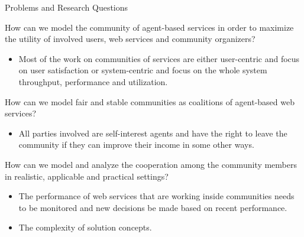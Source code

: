\documentclass{beamer}
\begin{document}
\begin{frame}{Problems and Research Questions}


    \footnotesize{\colorbox{blue}{\color{white}{R1}} How can we model the community of agent-based services in order to maximize the utility
        of involved users, web services and community organizers?}\\
        \begin{itemize}
            \item Most of the work on communities of
            services are either user-centric and focus on user satisfaction
            or system-centric and focus on the whole system throughput, performance and utilization.
        \end{itemize}
    \vspace{0.3cm} \colorbox{blue}{\color{white}{R2}} How can we model fair and stable communities as coalitions of agent-based web services?\\
        \begin{itemize}
            \item All parties involved are self-interest agents and have the right to leave the community if they can improve their income in some other ways.
        \end{itemize}
    \vspace{0.3cm} \colorbox{blue}{\color{white}{R3}} How can we model and analyze the cooperation
        among the community members in realistic, applicable and practical settings?\\
        \begin{itemize}
            \item The performance of web services that are working inside communities needs to be monitored and new decisions be made based on recent performance.
            \item The complexity of solution concepts.
        \end{itemize}
\end{frame}
\end{document}
